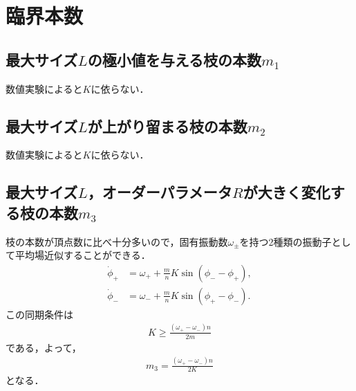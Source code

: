 \documentclass[../main]{subfiles}
\begin{document}
\section{臨界本数}
\subsection{最大サイズ$L$の極小値を与える枝の本数$m_1$}
数値実験によると$K$に依らない．
\subsection{最大サイズ$L$が上がり留まる枝の本数$m_2$}
数値実験によると$K$に依らない．
\subsection{最大サイズ$L$，オーダーパラメータ$R$が大きく変化する枝の本数$m_3$}
枝の本数が頂点数に比べ十分多いので，固有振動数$\omega_\pm$を持つ2種類の振動子として平均場近似することができる．
\begin{align*}
    \dot{\phi}_+&=\omega_++\frac{m}{n}K\sin(\phi_--\phi_+),\\
    \dot{\phi}_-&=\omega_-+\frac{m}{n}K\sin(\phi_+-\phi_-).
\end{align*}
この同期条件は
\begin{align*}
    K\geq \frac{(\omega_+-\omega_-)n}{2m}
\end{align*}
である，よって，
\begin{align*}
    m_3=\frac{(\omega_+-\omega_-)n}{2K}
\end{align*}
となる．
\end{document}
